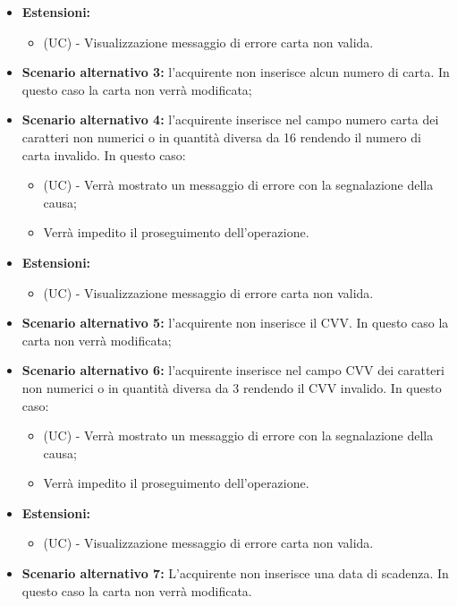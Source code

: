 \begin{itemize}
    \item \textbf{Estensioni:}
    \begin{itemize}
        \item (UC) - Visualizzazione messaggio di errore carta non valida.
    \end{itemize}
    \item \textbf{Scenario alternativo 3:} l'acquirente non inserisce alcun numero di carta. In questo caso la carta non verrà modificata;
    \item \textbf{Scenario alternativo 4:} l'acquirente inserisce nel campo numero carta dei caratteri non numerici o in quantità diversa da 16 rendendo il numero di carta invalido. In questo caso:
    \begin{itemize}
        \item (UC) - Verrà mostrato un messaggio di errore con la segnalazione della causa;
        \item Verrà impedito il proseguimento dell'operazione.
    \end{itemize}
    \item \textbf{Estensioni:}
    \begin{itemize}
        \item (UC) - Visualizzazione messaggio di errore carta non valida.
    \end{itemize}
    \item \textbf{Scenario alternativo 5:} l'acquirente non inserisce il CVV. In questo caso la carta non verrà modificata;
    \item \textbf{Scenario alternativo 6:} l'acquirente inserisce nel campo CVV dei caratteri non numerici o in quantità diversa da 3 rendendo il CVV invalido. In questo caso:
    \begin{itemize}
        \item (UC) - Verrà mostrato un messaggio di errore con la segnalazione della causa;
        \item Verrà impedito il proseguimento dell'operazione.
    \end{itemize}
    \item \textbf{Estensioni:}
    \begin{itemize}
        \item (UC) - Visualizzazione messaggio di errore  carta non valida.
    \end{itemize}
    \item \textbf{Scenario alternativo 7:} L'acquirente non inserisce una data di scadenza. In questo caso la carta non verrà modificata.
\end{itemize}

